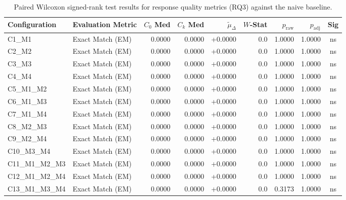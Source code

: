 \begin{table}[p]
\centering
\scriptsize
\setlength{\tabcolsep}{2.4pt}
\renewcommand{\arraystretch}{0.92}
\caption{Paired Wilcoxon signed-rank test results for response quality metrics (RQ3) against the naive baseline.}
\label{tab:wilcoxon_rq3}
\begin{tabular*}{\textwidth}{@{\extracolsep{\fill}} l l r r r r r r c @{}}
\toprule
\textbf{Configuration} & \textbf{Evaluation Metric} & \textbf{$C_0$ Med} & \textbf{$C_k$ Med} & \textbf{$\tilde{\mu}_\Delta$} & \textbf{$W$-Stat} & \textbf{$p_{\text{raw}}$} & \textbf{$p_{\text{adj}}$} & \textbf{Sig} \\
\midrule
C1\_M1          & Exact Match (EM)     & 0.0000 & 0.0000 & +0.0000 & 0.0 & 1.0000 & 1.0000 & ns \\
\addlinespace
C2\_M2          & Exact Match (EM)     & 0.0000 & 0.0000 & +0.0000 & 0.0 & 1.0000 & 1.0000 & ns \\
\addlinespace
C3\_M3          & Exact Match (EM)     & 0.0000 & 0.0000 & +0.0000 & 0.0 & 1.0000 & 1.0000 & ns \\
\addlinespace
C4\_M4          & Exact Match (EM)     & 0.0000 & 0.0000 & +0.0000 & 0.0 & 1.0000 & 1.0000 & ns \\
\addlinespace
C5\_M1\_M2      & Exact Match (EM)     & 0.0000 & 0.0000 & +0.0000 & 0.0 & 1.0000 & 1.0000 & ns \\
\addlinespace
C6\_M1\_M3      & Exact Match (EM)     & 0.0000 & 0.0000 & +0.0000 & 0.0 & 1.0000 & 1.0000 & ns \\
\addlinespace
C7\_M1\_M4      & Exact Match (EM)     & 0.0000 & 0.0000 & +0.0000 & 0.0 & 1.0000 & 1.0000 & ns \\
\addlinespace
C8\_M2\_M3      & Exact Match (EM)     & 0.0000 & 0.0000 & +0.0000 & 0.0 & 1.0000 & 1.0000 & ns \\
\addlinespace
C9\_M2\_M4      & Exact Match (EM)     & 0.0000 & 0.0000 & +0.0000 & 0.0 & 1.0000 & 1.0000 & ns \\
\addlinespace
C10\_M3\_M4     & Exact Match (EM)     & 0.0000 & 0.0000 & +0.0000 & 0.0 & 1.0000 & 1.0000 & ns \\
\addlinespace
C11\_M1\_M2\_M3 & Exact Match (EM)     & 0.0000 & 0.0000 & +0.0000 & 0.0 & 1.0000 & 1.0000 & ns \\
\addlinespace
C12\_M1\_M2\_M4 & Exact Match (EM)     & 0.0000 & 0.0000 & +0.0000 & 0.0 & 1.0000 & 1.0000 & ns \\
\addlinespace
C13\_M1\_M3\_M4 & Exact Match (EM)     & 0.0000 & 0.0000 & +0.0000 & 0.0 & 0.3173 & 1.0000 & ns \\

\end{tabular*}
\end{table}
